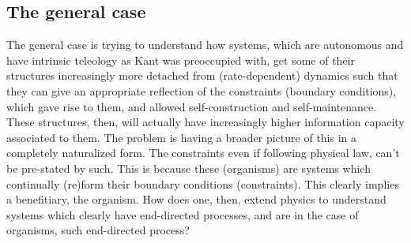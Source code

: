 \documentclass[a4paper,12pt,twoside,leqno]{article}
\begin{document}
\subsection*{The general case}
The general case is trying to understand how systems, which are autonomous and have intrinsic teleology as Kant was preoccupied with, get some of their structures increasingly more detached from (rate-dependent) dynamics such that they can give an appropriate reflection of the constraints (boundary conditions), which gave rise to them, and allowed self-construction and self-maintenance. These structures, then, will actually have increasingly higher information capacity associated to them. The problem is having a broader picture of this in a completely naturalized form. The constraints even if following physical law, can't be pre-stated by such. This is because these (organisms) are systems which continually (re)form their boundary conditions (constraints). This clearly implies a benefitiary, the organism. How does one, then, extend physics to understand systems which clearly have end-directed processes, and are in the case of organisms, such end-directed process?
\end{document}

